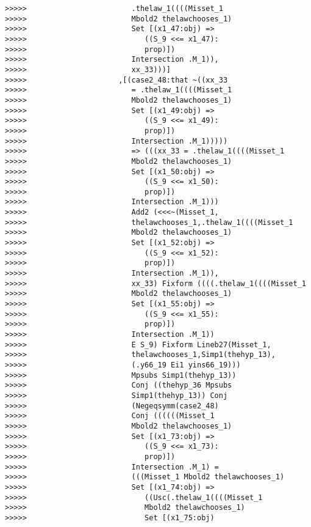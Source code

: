 \documentclass[12pt]{article}
\begin{document}
\begin{verbatim}
>>>>>                        .thelaw_1((((Misset_1
>>>>>                        Mbold2 thelawchooses_1)
>>>>>                        Set [(x1_47:obj) =>
>>>>>                           ((S_9 <<= x1_47):
>>>>>                           prop)])
>>>>>                        Intersection .M_1)),
>>>>>                        xx_33)))]
>>>>>                     ,[(case2_48:that ~((xx_33
>>>>>                        = .thelaw_1((((Misset_1
>>>>>                        Mbold2 thelawchooses_1)
>>>>>                        Set [(x1_49:obj) =>
>>>>>                           ((S_9 <<= x1_49):
>>>>>                           prop)])
>>>>>                        Intersection .M_1)))))
>>>>>                        => (((xx_33 = .thelaw_1((((Misset_1
>>>>>                        Mbold2 thelawchooses_1)
>>>>>                        Set [(x1_50:obj) =>
>>>>>                           ((S_9 <<= x1_50):
>>>>>                           prop)])
>>>>>                        Intersection .M_1)))
>>>>>                        Add2 (<<<~(Misset_1,
>>>>>                        thelawchooses_1,.thelaw_1((((Misset_1
>>>>>                        Mbold2 thelawchooses_1)
>>>>>                        Set [(x1_52:obj) =>
>>>>>                           ((S_9 <<= x1_52):
>>>>>                           prop)])
>>>>>                        Intersection .M_1)),
>>>>>                        xx_33) Fixform ((((.thelaw_1((((Misset_1
>>>>>                        Mbold2 thelawchooses_1)
>>>>>                        Set [(x1_55:obj) =>
>>>>>                           ((S_9 <<= x1_55):
>>>>>                           prop)])
>>>>>                        Intersection .M_1))
>>>>>                        E S_9) Fixform Lineb27(Misset_1,
>>>>>                        thelawchooses_1,Simp1(thehyp_13),
>>>>>                        (.y66_19 Ei1 yins66_19)))
>>>>>                        Mpsubs Simp1(thehyp_13))
>>>>>                        Conj ((thehyp_36 Mpsubs
>>>>>                        Simp1(thehyp_13)) Conj
>>>>>                        (Negeqsymm(case2_48)
>>>>>                        Conj ((((((Misset_1
>>>>>                        Mbold2 thelawchooses_1)
>>>>>                        Set [(x1_73:obj) =>
>>>>>                           ((S_9 <<= x1_73):
>>>>>                           prop)])
>>>>>                        Intersection .M_1) =
>>>>>                        (((Misset_1 Mbold2 thelawchooses_1)
>>>>>                        Set [(x1_74:obj) =>
>>>>>                           ((Usc(.thelaw_1((((Misset_1
>>>>>                           Mbold2 thelawchooses_1)
>>>>>                           Set [(x1_75:obj)

\end{verbatim}
\end{document}
